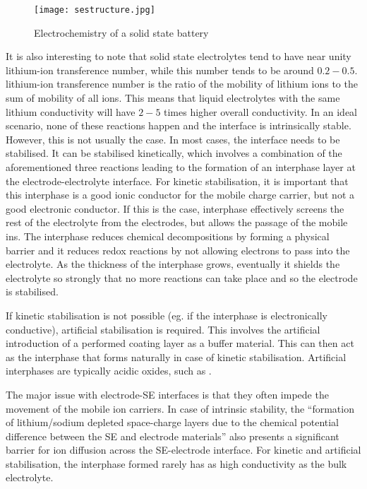 \documentclass[10pt,a4paper, titlepage]{article}
\begin{document}
\begin{figure}
\centering
\texttt{[image: sestructure.jpg]}
\caption{\label{sestructure.jpg} Electrochemistry of a solid state battery \cite{RN1}}
\end{figure}

It is also interesting to note that solid state electrolytes tend to have near unity lithium-ion transference number, while this number tends to be around $ 0.2-0.5 $. lithium-ion transference number is the ratio of the mobility of lithium ions to the sum of mobility of all ions. 
This means that liquid electrolytes with the same lithium conductivity will have $ 2-5 $ times higher overall conductivity. \cite{RN30}
In an ideal scenario, none of these reactions happen and the interface is intrinsically stable.
However, this is not usually the case.
In most cases, the interface needs to be stabilised.
It can be stabilised kinetically, which involves a combination of the aforementioned three reactions leading to the formation of an interphase layer at the electrode-electrolyte interface.
For kinetic stabilisation, it is important that this interphase is a good ionic conductor for the mobile charge carrier, but not a good electronic conductor.
If this is the case, interphase effectively screens the rest of the electrolyte from the electrodes, but allows the passage of the mobile ins.
The interphase reduces chemical decompositions by forming a physical barrier and it reduces redox reactions by not allowing electrons to pass into the electrolyte.
As the thickness of the interphase grows, eventually it shields the electrolyte so strongly that no more reactions can take place and so the electrode is stabilised. \cite{RN1}

If kinetic stabilisation is not possible (eg. if the interphase is electronically conductive), artificial stabilisation is required. 
This involves the artificial introduction of a performed coating layer as a buffer material. 
This can then act as the interphase that forms naturally in case of kinetic stabilisation.
Artificial interphases are typically acidic oxides, such as . \cite{RN77}

The major issue with electrode-SE interfaces is that they often impede the movement of the mobile ion carriers. 
In case of intrinsic stability, the “formation of lithium/sodium depleted space-charge layers due to the chemical potential difference between the SE and electrode materials” also presents a significant barrier for ion diffusion across the SE-electrode interface. \cite{RN46}
For kinetic and artificial stabilisation, the interphase formed rarely has as high conductivity as the bulk electrolyte.
\end{document}

